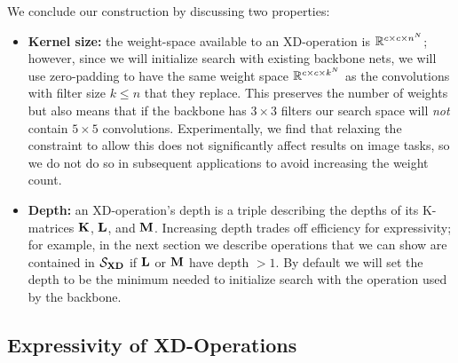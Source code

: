 We conclude our construction by discussing two properties:
\begin{itemize}[leftmargin=*,topsep=-1pt,noitemsep]\setlength\itemsep{2pt}
	\item{\bf Kernel size:} the weight-space available to an XD-operation is $\mathbb R^{c\times c\times n^N}$; however, since we will initialize search with existing backbone nets, we will use zero-padding to have the same weight space $\mathbb R^{c\times c\times k^N}$ as the convolutions with filter size $k\le n$ that they replace.
	This preserves the number of weights but also means that if the backbone has $3\times3$ filters our search space will {\em not} contain $5\times5$ convolutions.
	Experimentally, we find that relaxing the constraint to allow this does not significantly affect results on image tasks, so we do not do so in subsequent applications to avoid increasing the weight count.
	\item{\bf Depth:} an XD-operation's depth is a triple describing the depths of its K-matrices $\mathbf{K}$, $\mathbf{L}$, and $\mathbf{M}$.
	Increasing depth trades off efficiency for expressivity;
	for example, in the next section we describe operations that we can show are contained in $\mathcal S_{\mathbf{XD}}$ if $\mathbf{L}$ or $\mathbf{M}$ have depth $>1$.
	By default we will set the depth to be the minimum needed to initialize search with the operation used by the backbone.
\end{itemize}


\subsection{Expressivity of XD-Operations}\label{subsec:express}

